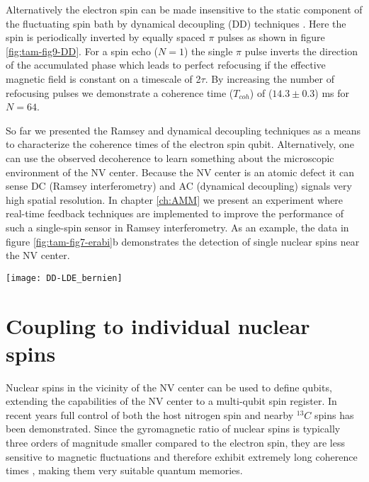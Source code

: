 Alternatively the electron spin can be made insensitive to the static component of the fluctuating spin bath by dynamical decoupling (DD) techniques \cite{Lange_Science_2010,Ryan_Phys.Rev.Lett._2010}. Here the spin is periodically inverted by equally spaced $\pi$ pulses as shown in figure \ref{fig:tam-fig9-DD}. For a spin echo ($N = 1$) the single $\pi$ pulse inverts the direction of the accumulated phase which leads to perfect refocusing if the effective magnetic field is constant on a timescale of 2$\tau$. By increasing the number of refocusing pulses we demonstrate a coherence time ($T_{coh}$) of ($14.3 \pm 0.3$) ms for $N = 64$.

So far we presented the Ramsey and dynamical decoupling techniques as a means to characterize the coherence times of the electron spin qubit. Alternatively, one can use the observed decoherence to learn something about the microscopic environment of the NV center. Because the NV center is an atomic defect it can sense DC (Ramsey interferometry) and AC (dynamical decoupling) signals very high spatial resolution. In chapter \ref{ch:AMM} we present an experiment where real-time feedback techniques are implemented to improve the performance of such a single-spin sensor in Ramsey interferometry. As an example, the data in figure \ref{fig:tam-fig7-erabi}b demonstrates the detection of single nuclear spins near the NV center.

\begin{figure*}
	\centering
	\texttt{[image: DD-LDE\_bernien]}
	\caption{\label{fig:tam-fig9-DD} \textbf{Dynamical Decoupling of the electron spin} The coherence of the electron spin as a function of the total free evolution time $t_{FE} = 2 \tau N$ during an $N$-pulse dynamical decoupling sequence\cite{Lange_Science_2010}. The solid lines are a fit to the function $A e^{(-\frac{t{FE}}{T_{coh}})^3} + 0.5$. For $N = 64$ we find $T_{coh} = $($14.3 \pm 0.3$) ms. }
\end{figure*}

\section{Coupling to individual nuclear spins}
Nuclear spins in the vicinity of the NV center can be used to define qubits, extending the capabilities of the NV center to a multi-qubit spin register. In recent years full control of both the host nitrogen spin \cite{Gaebel_NatPhys_2006,Hanson_Phys.Rev.Lett._2006,Neumann_Science_2010,Fuchs_NatPhys_2011,vanderSar_Nature_2012} and nearby $^{13}C$ spins \cite{Jelezko_Phys.Rev.Lett._2004,Dutt_Science_2007,Neumann_Science_2008,Jiang_Science_2009,Smeltzer_Phys.Rev.A_2009,Taminiau_Phys.Rev.Lett._2012} has been demonstrated. Since the gyromagnetic ratio of nuclear spins is typically three orders of magnitude smaller compared to the electron spin, they are less sensitive to magnetic fluctuations and therefore exhibit extremely long coherence times \cite{Maurer_Science_2012}, making them very suitable quantum memories.

